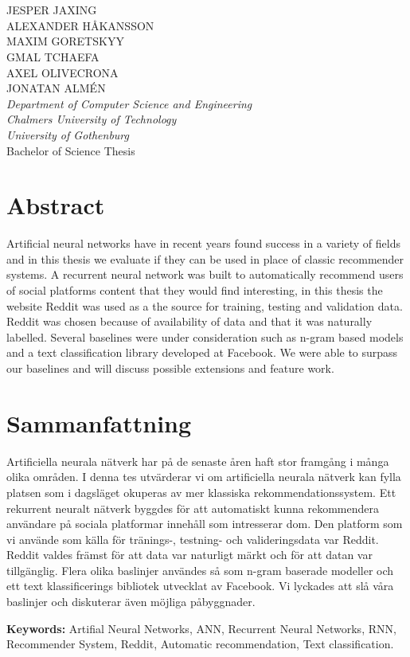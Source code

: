 \large
\begin{flushleft}
\textbf{\varthetitle}\\
\varthesubtitle\\[0.7cm]
\end{flushleft}
JESPER JAXING\\
ALEXANDER HÅKANSSON\\
MAXIM GORETSKYY\\
GMAL TCHAEFA\\
AXEL OLIVECRONA\\
JONATAN ALMÉN\\
\normalsize
\textit{Department of Computer Science and Engineering\\
Chalmers University of Technology\\
University of Gothenburg}\\[0.7cm]
Bachelor of Science Thesis
\setlength{\parskip}{0.5cm}

\thispagestyle{plain}			%
\setlength{\parskip}{0pt plus 1.0pt}
\section*{Abstract}
Artificial neural networks have in recent years found success in a variety of fields and in this thesis we evaluate if they can be used in place of classic recommender systems. A recurrent neural network was built to automatically recommend users of social platforms content that they would find interesting, in this thesis the website Reddit was used as a the source for training, testing and validation data. Reddit was chosen because of availability of data and that it was naturally labelled. Several baselines were under consideration such as n-gram based models and a text classification library developed at Facebook. We were able to surpass our baselines and will discuss possible extensions and feature work.

\section*{Sammanfattning}
Artificiella neurala nätverk har på de senaste åren haft stor framgång i många olika områden. I denna tes utvärderar vi om artificiella neurala nätverk kan fylla platsen som i dagsläget okuperas av mer klassiska rekommendationssystem. Ett rekurrent neuralt nätverk byggdes för att automatiskt kunna rekommendera användare på sociala platformar innehåll som intresserar dom. Den platform som vi använde som källa för tränings-, testning- och valideringsdata var Reddit. Reddit valdes främst för att data var naturligt märkt och för att datan var tillgänglig. Flera olika baslinjer användes så som n-gram baserade modeller och ett text klassificerings bibliotek utvecklat av Facebook. Vi lyckades att slå våra baslinjer och diskuterar även möjliga påbyggnader.

\vfill
\textbf{Keywords:} Artifial Neural Networks, ANN, Recurrent Neural Networks, RNN, Recommender System, Reddit, Automatic recommendation, Text classification.

\newpage				%
\thispagestyle{empty}
\mbox{}